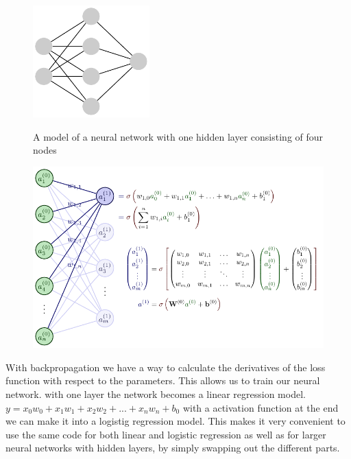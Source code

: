 \documentclass[twoside,11pt]{report}
\begin{document}
    \begin{figure}
        \begin{center}
            \includegraphics[width=0.4\textwidth]{tikzfigures/nn.pdf}
        \end{center}
        \caption{A model of a neural network with one hidden layer consisting of four nodes}\label{fig:nn}
        \cite{neutelings_tikzcode}
    \end{figure}
    \begin{figure}
        \begin{center}
            \includegraphics[width=\textwidth]{tikzfigures/nnActivation.pdf}
        \end{center}
        \caption{}\label{fig:nn_math}
        \cite{neutelings_tikzcode}
    \end{figure}


    With backpropagation we have a way to calculate the derivatives of the loss function with 
    respect to the parameters. This allows us to train our neural network. 
    with one layer the network becomes a linear regression model. $y = x_0w_0 + x_1w_1 + x_2w_2 + ... + x_nw_n + b_0$ 
    with a activation function at the end we can make it into a logistig regression model.
    This makes it very convenient to use the same code for both linear and logistic regression as well as for 
    larger neural networks with hidden layers, by simply swapping out the different parts.
\end{document}
